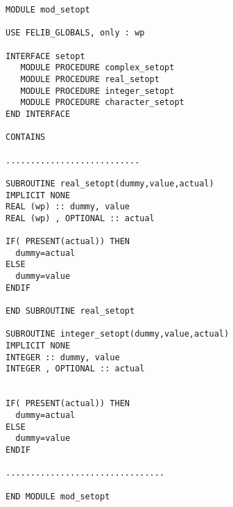 \begin{verbatim}
MODULE mod_setopt

USE FELIB_GLOBALS, only : wp

INTERFACE setopt
   MODULE PROCEDURE complex_setopt
   MODULE PROCEDURE real_setopt
   MODULE PROCEDURE integer_setopt
   MODULE PROCEDURE character_setopt
END INTERFACE

CONTAINS

...........................

SUBROUTINE real_setopt(dummy,value,actual)
IMPLICIT NONE
REAL (wp) :: dummy, value
REAL (wp) , OPTIONAL :: actual

IF( PRESENT(actual)) THEN
  dummy=actual
ELSE
  dummy=value
ENDIF

END SUBROUTINE real_setopt

SUBROUTINE integer_setopt(dummy,value,actual)
IMPLICIT NONE
INTEGER :: dummy, value
INTEGER , OPTIONAL :: actual


IF( PRESENT(actual)) THEN
  dummy=actual
ELSE
  dummy=value
ENDIF

................................

END MODULE mod_setopt
\end{verbatim}